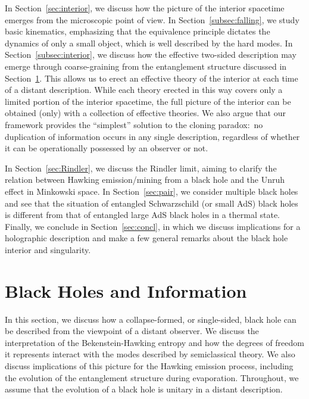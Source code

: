 \documentclass[12pt]{article}
\begin{document}
In Section~\ref{sec:interior}, we discuss how the picture of 
the interior spacetime emerges from the microscopic point of 
view.  In Section~\ref{subsec:falling}, we study basic kinematics, 
emphasizing that the equivalence principle dictates the dynamics 
of only a small object, which is well described by the hard modes. 
In Section~\ref{subsec:interior}, we discuss how the effective 
two-sided description may emerge through coarse-graining from 
the entanglement structure discussed in Section~\ref{sec:distant}. 
This allows us to erect an effective theory of the interior at 
each time of a distant description.  While each theory erected 
in this way covers only a limited portion of the interior spacetime, 
the full picture of the interior can be obtained (only) with a 
collection of effective theories.  We also argue that our framework 
provides the ``simplest'' solution to the cloning paradox:\ 
no duplication of information occurs in any single description, 
regardless of whether it can be operationally possessed by an 
observer or not.

In Section~\ref{sec:Rindler}, we discuss the Rindler limit, aiming 
to clarify the relation between Hawking emission/mining from 
a black hole and the Unruh effect in Minkowski space.  In 
Section~\ref{sec:pair}, we consider multiple black holes and 
see that the situation of entangled Schwarzschild (or small 
AdS) black holes is different from that of entangled large 
AdS black holes in a thermal state.  Finally, we conclude in 
Section~\ref{sec:concl}, in which we discuss implications for 
a holographic description and make a few general remarks about 
the black hole interior and singularity.


\section{Black Holes and Information}
\label{sec:distant}

In this section, we discuss how a collapse-formed, or single-sided, 
black hole can be described from the viewpoint of a distant 
observer.  We discuss the interpretation of the Bekenstein-Hawking 
entropy and how the degrees of freedom it represents interact 
with the modes described by semiclassical theory.  We also discuss 
implications of this picture for the Hawking emission process, 
including the evolution of the entanglement structure during 
evaporation.  Throughout, we assume that the evolution of a black 
hole is unitary in a distant description.
\end{document}
